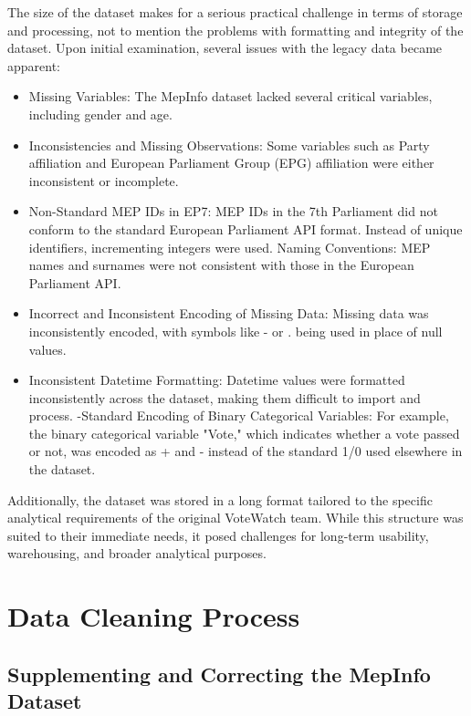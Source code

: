 \documentclass{article}
\begin{document}
    The size of the dataset makes for a serious practical challenge in terms of storage and processing, not to
    mention the problems with formatting and integrity of the dataset. Upon initial examination, several issues with the
    legacy data became apparent:

    \begin{itemize}
        \item Missing Variables: The MepInfo dataset lacked several critical variables, including gender and age.
        \item
        Inconsistencies and Missing Observations: Some variables such as Party affiliation and European Parliament Group
        (EPG) affiliation were either inconsistent or incomplete.
        \item
        Non-Standard MEP IDs in EP7: MEP IDs in the 7th Parliament did not conform to the standard European Parliament
        API format. Instead of unique identifiers, incrementing integers were used.
        \itemInconsistent Naming Conventions: MEP names and surnames were not consistent with those in the European
        Parliament API.
        \item
        Incorrect and Inconsistent Encoding of Missing Data: Missing data was inconsistently encoded, with symbols like
        - or . being used in place of null values.
        \item
        Inconsistent Datetime Formatting: Datetime values were formatted inconsistently across the dataset, making them
        difficult to import and process.
        \itemNon-Standard Encoding of Binary Categorical Variables: For example, the binary categorical variable "Vote,"
        which indicates whether a vote passed or not, was encoded as + and - instead of the standard 1/0 used elsewhere
        in the dataset.
    \end{itemize}
    Additionally, the dataset was stored in a long format tailored to the specific analytical requirements of the
    original VoteWatch team. While this structure was suited to their immediate needs, it posed challenges for long-term
    usability, warehousing, and broader analytical purposes.


    \section{Data Cleaning Process}

    \subsection{Supplementing and Correcting the MepInfo Dataset}
\end{document}
